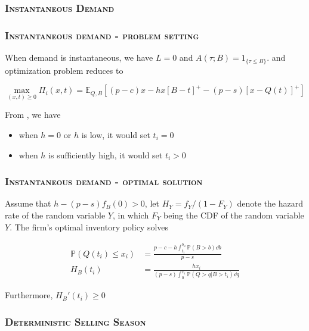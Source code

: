 \documentclass[aspectratio=169]{../presentation}
\begin{document}
    \subsubsection{\textsc{Instantaneous Demand}}

    \begin{frame}
        \frametitle{\textsc{Instantaneous demand - problem setting}}

        When demand is instantaneous, we have $L = 0$ and $A(\tau; B) = 1_{\{\tau\leq B\}}$. and optimization problem reduces to 

        \begin{equation}
            \max_{(x, t)\geq 0}\Pi_{i}(x, t) = \mathbb E_{Q, B}\left[(p-c)x - hx\left[B-t\right]^+ - (p-s)\left[x - Q(t)\right]^+\right]
            \label{eq:6}
        \end{equation}

        From , we have

        \begin{itemize}
            \item when $h = 0$ or $h$ is low, it would set $t_i = 0$
            \item when $h$ is sufficiently high, it would set $t_i > 0$
        \end{itemize}

    \end{frame}

    \begin{frame}
        \frametitle{\textsc{Instantaneous demand - optimal solution}}

        Assume that $h - (p-s)f_B(0) > 0$, let $H_Y = f_Y / (1 - F_Y)$ denote the hazard rate of the random variable $Y$, in which $F_Y$ being the CDF of the random variable $Y$. The firm's optimal inventory policy solves

        \begin{align}
            \mathbb P\left(Q\left(t_i\right)\leq x_i\right) &= \frac{p - c - h\int_{t_i}^{b_u} \mathbb P(B>b)\dd b}{p - s} \\
            H_B\left(t_i\right) &= \frac{hx_i}{(p-s)\int_{0}^{x_i}\mathbb P(Q > q|B > t_i)\dd q}
        \end{align}

        Furthermore, $H_B'\left(t_i\right)\geq 0$

    \end{frame}

    \subsubsection{\textsc{Deterministic Selling Season}}
\end{document}
